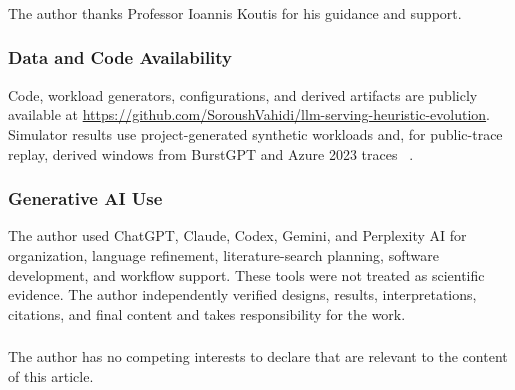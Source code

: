 \documentclass[runningheads]{llncs}
\begin{document}
\begin{credits}
\subsubsection{\ackname}
The author thanks Professor Ioannis Koutis for his guidance and support.

\subsubsection{Data and Code Availability}
Code, workload generators, configurations, and derived artifacts are publicly
available at
\url{https://github.com/SoroushVahidi/llm-serving-heuristic-evolution}.
Simulator results use project-generated synthetic workloads and,
for public-trace replay, derived windows from BurstGPT and Azure 2023 traces
~\cite{burstgpt2025,azurepublicdataset2023,splitwise2024}.

\subsubsection{Generative AI Use}
The author used ChatGPT, Claude, Codex, Gemini, and Perplexity AI for
organization, language refinement, literature-search planning, software
development, and workflow support. These tools were not treated as scientific
evidence. The author independently verified designs, results, interpretations,
citations, and final content and takes responsibility for the work.

\subsubsection{\discintname}
The author has no competing interests to declare that are relevant to the
content of this article.
\end{credits}
\vspace{-5pt}



\end{document}
